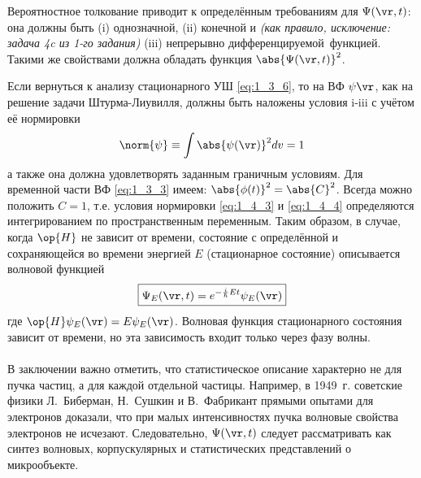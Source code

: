Вероятностное толкование приводит к определённым требованиям для $\Psi(\vr,t)$: она должны быть (i) однозначной, (ii) конечной и \textit{(как правило, исключение: задача 4c из 1-го задания)} (iii) непрерывно дифференцируемой{\footnotemark}~функцией. Такими же свойствами должна обладать функция $\abs{\Psi(\vr,t)}^2$.


Если вернуться к анализу стационарного УШ \eqref{eq:1_3_6}, то на ВФ $\psi{\vr}$, как на решение задачи Штурма-Лиувилля, должны быть наложены условия i-iii с учётом её нормировки
\begin{equation}
\label{eq:1_4_4}
\norm{\psi} \equiv \int \abs{\psi(\vr)}^2 dv = 1
\end{equation}%
%
а также она должна удовлетворять заданным граничным условиям. Для временной части ВФ \eqref{eq:1_3_3} имеем: $\abs{\phi (t)}^2= \abs{C}^2$. Всегда можно положить $C = 1$, т.е. условия нормировки \eqref{eq:1_4_3} и \eqref{eq:1_4_4} определяются интегрированием по пространственным переменным. Таким образом, в случае, когда $\op{H}$ не зависит от времени, состояние с определённой и сохраняющейся во времени энергией $E$ (стационарное состояние) описывается волновой функцией
$$
\boxed{
  \Psi_E(\vr,t) = e^{-\frac{i}{\hbar}Et} \psi_E(\vr)
}
$$ где $\op{H} \psi_E(\vr) = E\psi_E(\vr)$. Волновая функция стационарного состояния зависит от времени, но эта зависимость входит только через фазу волны.
\\
\\

В заключении важно отметить, что статистическое описание характерно не для пучка частиц, а для каждой отдельной частицы. Например, в 1949~г. советские физики Л.~Биберман, Н.~Сушкин и В.~Фабрикант прямыми опытами для электронов доказали, что при малых интенсивностях пучка волновые свойства электронов не исчезают. Следовательно, $\Psi(\vr,t)$ следует рассматривать как синтез волновых, корпускулярных и статистических представлений о микрообъекте.